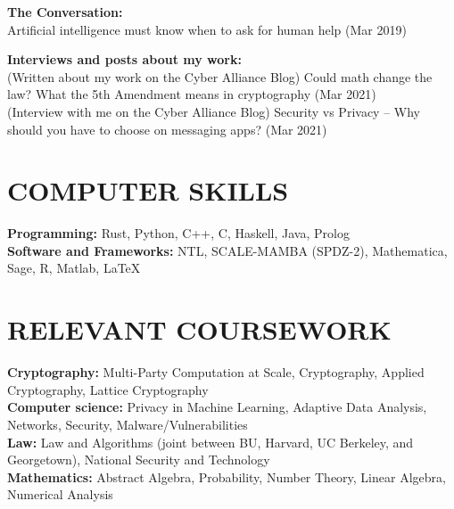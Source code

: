 \documentclass{res}
\begin{document}
\begin{resume}
\textbf{The Conversation:} \\         
    Artificial intelligence must know when to ask for human help (Mar 2019) 

\textbf{Interviews and posts about my work:} \\
    (Written about my work on the Cyber Alliance Blog) Could math change the law? What the 5th Amendment means in cryptography (Mar 2021) \\
    (Interview with me on the Cyber Alliance Blog) Security vs Privacy -- Why should you have to choose on messaging apps? (Mar 2021) \\




\section{COMPUTER SKILLS}  
\vspace{0.1in}

\textbf{Programming:} Rust, Python, C++, C, Haskell, Java, Prolog\\         
\textbf{Software and Frameworks:} NTL, SCALE-MAMBA (SPDZ-2), Mathematica, Sage, R, Matlab, \LaTeX \\



\section{RELEVANT COURSEWORK}   
\vspace{0.1in}

    \textbf{Cryptography:} Multi-Party Computation at Scale, Cryptography,
    Applied Cryptography, Lattice Cryptography \\
    \textbf{Computer science:} Privacy in Machine Learning, Adaptive Data Analysis, 
    Networks, Security, Malware/Vulnerabilities \\   
    \textbf{Law:} Law and Algorithms (joint between BU, Harvard, UC Berkeley, and Georgetown), National Security and Technology \\
    \textbf{Mathematics:} Abstract Algebra, Probability, Number Theory, Linear Algebra,
    Numerical Analysis  \\



\end{resume}
\end{document}
